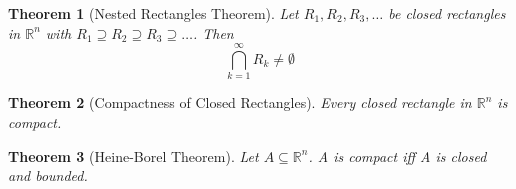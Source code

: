 \documentclass[11pt, oneside]{book}
\theoremstyle{break}
\newtheorem{thm}{Theorem}[section]
\newcommand{\bb}[1]{\mathbb{#1}}			%
\begin{document}
\begin{thm}[Nested Rectangles Theorem]
	Let $R_1, R_2, R_3, \hdots$ be closed rectangles in $\bb{R}^n$ with $R_1 \supseteq R_2 \supseteq R_3 \supseteq \hdots $. Then
	\begin{equation*}
		\bigcap_{k=1}^\infty R_k \neq \emptyset
	\end{equation*}
\end{thm}

\begin{thm}[Compactness of Closed Rectangles]\label{compact_closed_rect}
	Every closed rectangle in $\bb{R}^n$ is compact.
\end{thm}

\begin{thm}[Heine-Borel Theorem]
	Let $A \subseteq \bb{R}^n$. A is compact iff A is closed and bounded.
\end{thm}
\end{document}
